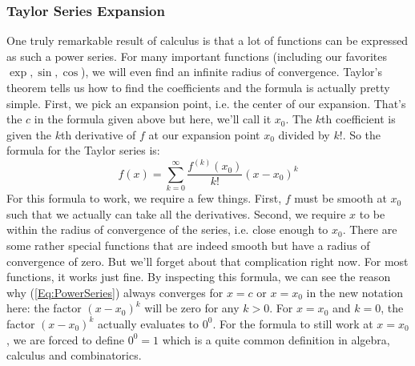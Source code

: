 \subsubsection{Taylor Series Expansion}
One truly remarkable result of calculus is that a lot of functions can be expressed as such a power series. For many important functions (including our favorites $\exp, \sin, \cos$), we will even find an infinite radius of convergence. Taylor's theorem tells us how to find the coefficients and the formula is actually pretty simple. First, we pick an expansion point, i.e. the center of our expansion. That's the $c$ in the formula given above but here, we'll call it $x_0$. The $k$th coefficient is given the $k$th derivative of $f$ at our expansion point $x_0$ divided by $k!$. So the formula for the Taylor series is:
\begin{equation}
\label{Eq:TaylorSeries}
f(x) = \sum_{k=0}^\infty \frac{f^{(k)}(x_0)}{k!} (x-x_0)^k
\end{equation}
For this formula to work, we require a few things. First, $f$ must be smooth at $x_0$ such that we actually can take all the derivatives. Second, we require $x$ to be within the radius of convergence of the series, i.e. close enough to $x_0$. There are some rather special functions that are indeed smooth but have a radius of convergence of zero. But we'll forget about that complication right now. For most functions, it works just fine. By inspecting this formula, we can see the reason why (\ref{Eq:PowerSeries}) always converges for $x=c$ or $x=x_0$ in the new notation here: the factor $(x-x_0)^k$ will be zero for any $k > 0$. For $x = x_0$ and $k = 0$, the factor $(x-x_0)^k$ actually evaluates to $0^0$. For the formula to still work at $x=x_0$, we are forced to define $0^0 = 1$ which is a quite common definition in algebra, calculus and combinatorics.





